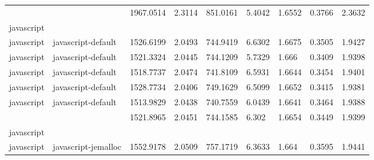 \begin{longtable}[h]{|lllllllll|}
               &                        & 1967.0514                 & 2.3114                                                               & 851.0161              & 5.4042           & 1.6552           & 0.3766       & 2.3632        \\
javascript     &                        &                           &                                                                      &                       &                  &                  &              &               \\
javascript     & javascript-default     & 1526.6199                 & 2.0493                                                               & 744.9419              & 6.6302           & 1.6675           & 0.3505       & 1.9427        \\
javascript     & javascript-default     & 1521.3324                 & 2.0445                                                               & 744.1209              & 5.7329           & 1.666            & 0.3409       & 1.9398        \\
javascript     & javascript-default     & 1518.7737                 & 2.0474                                                               & 741.8109              & 6.5931           & 1.6644           & 0.3454       & 1.9401        \\
javascript     & javascript-default     & 1528.7734                 & 2.0406                                                               & 749.1629              & 6.5099           & 1.6652           & 0.3415       & 1.9381        \\
javascript     & javascript-default     & 1513.9829                 & 2.0438                                                               & 740.7559              & 6.0439           & 1.6641           & 0.3464       & 1.9388        \\
               &                        & 1521.8965                 & 2.0451                                                               & 744.1585              & 6.302            & 1.6654           & 0.3449       & 1.9399        \\
javascript     &                        &                           &                                                                      &                       &                  &                  &              &               \\
javascript     & javascript-jemalloc    & 1552.9178                 & 2.0509                                                               & 757.1719              & 6.3633           & 1.664            & 0.3595       & 1.9441        \\

\end{longtable}
